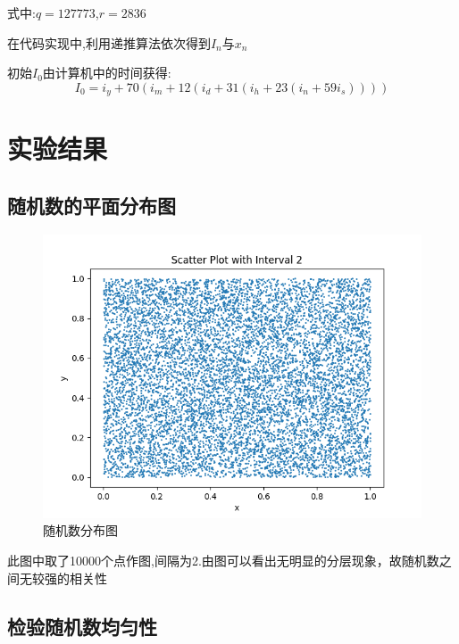 \documentclass[UTF8]{ctexart}
\begin{document}
式中:$q=127773$,\quad$r=2836$

在代码实现中,利用递推算法依次得到$I_n$与$x_n$

初始$I_0$由计算机中的时间获得:
\begin{equation}
    I_0=i_y+70(i_m+12(i_d+31(i_h+23(i_n+59i_s))))
\end{equation}

\section{实验结果}
\subsection{随机数的平面分布图}
\begin{figure}[htbp]
    \centering
    \includegraphics[scale=0.5]{figure.png}
    \caption{随机数分布图}
\end{figure}
此图中取了10000个点作图,间隔为2.由图可以看出无明显的分层现象，故随机数之间无较强的相关性

\subsection{检验随机数均匀性}
\end{document}
